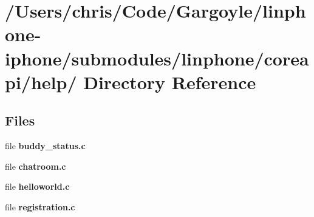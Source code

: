 \section{/\-Users/chris/\-Code/\-Gargoyle/linphone-\/iphone/submodules/linphone/coreapi/help/ \-Directory \-Reference}
\label{dir_3ba3ac17216b0ce0779de10a00eba9aa}
\subsection*{\-Files}
\begin{DoxyCompactItemize}
\item 
file {\bfseries buddy\-\_\-status.\-c}
\item 
file {\bfseries chatroom.\-c}
\item 
file {\bfseries helloworld.\-c}
\item 
file {\bfseries registration.\-c}
\end{DoxyCompactItemize}
